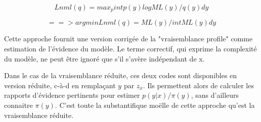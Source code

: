 \documentclass{article}
\begin{document}
$$Lnml(q) = max_p int p(y) log ML(y)/q(y) dy$$ 

$$==> argmin Lnml(q) = ML(y) / int ML(y) dy$$ 

Cette approche fournit une version corrig\'ee de la "vraisemblance profile" comme estimation de l'\'evidence du mod\`ele. Le terme correctif, qui exprime la complexit\'e du mod\`ele, ne peut \^etre ignor\'e que s'il s'av\`ere ind\'ependant de x. 

Dans le cas de la vraisemblance r\'eduite, ces deux codes sont disponibles en version r\'eduite, c-\`a-d en rempla\c{c}ant $y$ par $z_x$. Ils permettent alors de calculer les rapports d'\'evidence pertinents pour estimer $p(y|x)/\pi(y)$, sans d'ailleurs connaitre $\pi(y)$. C'est toute la substantifique mo\"elle de cette approche qu'est la vraisemblance r\'eduite. 
\end{document}
